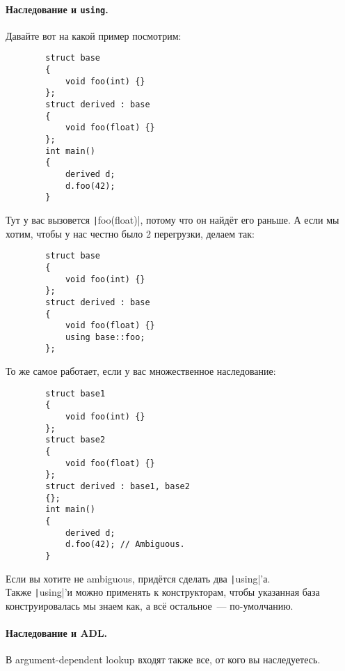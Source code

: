 \documentclass{article}
\begin{document}
    \paragraph{Наследование и \texttt{using}.}
    Давайте вот на какой пример посмотрим:
    \begin{verbatim}
        struct base
        {
            void foo(int) {}
        };
        struct derived : base
        {
            void foo(float) {}
        };
        int main()
        {
            derived d;
            d.foo(42);
        }
    \end{verbatim}
    Тут у вас вызовется \texttt|foo(float)|, потому что он найдёт его раньше. А если мы хотим, чтобы у нас честно было 2 перегрузки, делаем так:
    \begin{verbatim}
        struct base
        {
            void foo(int) {}
        };
        struct derived : base
        {
            void foo(float) {}
            using base::foo;
        };
    \end{verbatim}
    То же самое работает, если у вас множественное наследование:
    \begin{verbatim}
        struct base1
        {
            void foo(int) {}
        };
        struct base2
        {
            void foo(float) {}
        };
        struct derived : base1, base2
        {};
        int main()
        {
            derived d;
            d.foo(42); // Ambiguous.
        }
    \end{verbatim}
    Если вы хотите не ambiguous, придётся сделать два \texttt|using|'а.\\
    Также \texttt|using|'и можно применять к конструкторам, чтобы указанная база конструировалась мы знаем как, а всё остальное~--- по-умолчанию.
    \paragraph{Наследование и ADL.}
    В argument-dependent lookup входят также все, от кого вы наследуетесь.
\end{document}
